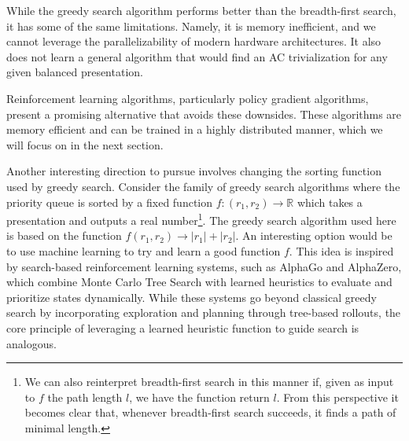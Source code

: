 While the greedy search algorithm performs better than the breadth-first search, it has some of the same limitations.
Namely, it is memory inefficient, and we cannot leverage the parallelizability of modern hardware architectures.
It also does not learn a general algorithm that would find an AC trivialization for any given balanced presentation.

Reinforcement learning algorithms, particularly policy gradient algorithms, present a promising alternative that avoids these downsides.
These algorithms are memory efficient and can be trained in a highly distributed manner, which we will focus on in the next section.

Another interesting direction to pursue involves changing the sorting function used by greedy search. Consider the family of greedy search algorithms where the priority queue is sorted by a fixed function $f: (r_1, r_2) \to \mathbb{R}$ which takes a presentation and outputs a real number\footnote{We can also reinterpret breadth-first search in this manner if, given as input to $f$ the path length $l$, we have the function return $l$. From this perspective it becomes clear that, whenever breadth-first search succeeds, it finds a path of minimal length.}. The greedy search algorithm used here is based on the function $f(r_1, r_2) \to |r_1| + |r_2|$. An interesting option would be to use machine learning to try and learn a good function $f$. This idea is inspired by search-based reinforcement learning systems, such as AlphaGo and AlphaZero, which combine Monte Carlo Tree Search with learned heuristics to evaluate and prioritize states dynamically. While these systems go beyond classical greedy search by incorporating exploration and planning through tree-based rollouts, the core principle of leveraging a learned heuristic function to guide search is analogous.